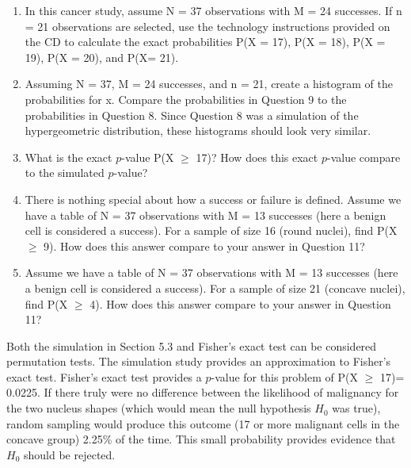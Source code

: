\documentclass[
]{report}
\begin{document}
\begin{enumerate}
\def\labelenumi{\arabic{enumi}.}
\setcounter{enumi}{8}
\item
  In this cancer study, assume N = 37 observations with M = 24 successes. If n = 21 observations are selected, use the technology instructions provided on the CD to calculate the exact probabilities P(X = 17), P(X = 18), P(X = 19), P(X = 20), and P(X= 21).
\item
  Assuming N = 37, M = 24 successes, and n = 21, create a histogram of the probabilities for x. Compare the probabilities in Question 9 to the probabilities in Question 8. Since Question 8 was a simulation of the hypergeometric distribution, these histograms should look very similar.
\item
  What is the exact \(\scriptstyle p\)-value P(X \(\scriptstyle \geq\) 17)? How does this exact \(\scriptstyle p\)-value compare to the simulated \(\scriptstyle p\)-value?
\item
  There is nothing special about how a success or failure is defined. Assume we have a table of N = 37 observations with M = 13 successes (here a benign cell is considered a success). For a sample of size 16 (round nuclei), find P(X \(\scriptstyle \geq\) 9). How does this answer compare to your answer in
  Question 11?
\item
  Assume we have a table of N = 37 observations with M = 13 successes (here a benign cell is considered a success). For a sample of size 21 (concave nuclei), find P(X \(\scriptstyle \geq\) 4). How does this answer compare to your answer in Question 11?
\end{enumerate}

Both the simulation in Section 5.3 and Fisher's exact test can be considered permutation tests. The simulation study provides an approximation to Fisher's exact test. Fisher's exact test provides a \(\scriptstyle p\)-value for this problem of P(X \(\scriptstyle \geq\) 17)= 0.0225. If there truly were no difference between the likelihood of malignancy for the two nucleus shapes (which would mean the null hypothesis \(\scriptstyle H_0\) was true), random sampling would produce this outcome (17 or more malignant cells in the concave group) 2.25\% of the time. This small probability provides evidence that \(\scriptstyle H_0\) should be rejected.
\end{document}
